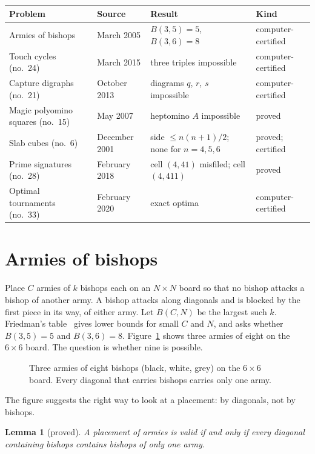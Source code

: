 \documentclass[11pt]{amsart}
\newtheorem{lemma}[theorem]{Lemma}
\theoremstyle{remark}
\begin{document}
\begin{center}
\footnotesize
\begin{tabular}{@{}llll@{}}
\toprule
Problem & Source & Result & Kind\\
\midrule
Armies of bishops & March 2005 & $B(3,5)=5$, $B(3,6)=8$ & computer-certified\\
Touch cycles (no.~24) & March 2015 & three triples impossible & computer-certified\\
Capture digraphs (no.~21) & October 2013 & diagrams $q$, $r$, $s$ impossible & computer-certified\\
Magic polyomino squares (no.~15) & May 2007 & heptomino $A$ impossible & proved\\
Slab cubes (no.~6) & December 2001 & side $\le n(n+1)/2$; none for $n=4,5,6$ & proved; certified\\
Prime signatures (no.~28) & February 2018 & cell $(4,41)$ misfiled; cell $(4,411)$ & proved\\
Optimal tournaments (no.~33) & February 2020 & exact optima & computer-certified\\
\bottomrule
\end{tabular}
\end{center}

\section{Armies of bishops}\label{sec:bishops}

Place $C$ armies of $k$ bishops each on an $N\times N$ board so that no bishop attacks a bishop of
another army. A bishop attacks along diagonals and is blocked by the first piece in its way, of
either army. Let $B(C,N)$ be the largest such $k$. Friedman's table~\cite{bishops} gives lower bounds
for small $C$ and $N$, and asks whether $B(3,5)=5$ and $B(3,6)=8$. Figure~\ref{fig:bishops} shows
three armies of eight on the $6\times6$ board. The question is whether nine is possible.

\begin{figure}[ht]
\centering

\caption{Three armies of eight bishops (black, white, grey) on the $6\times 6$ board. Every
diagonal that carries bishops carries only one army.}\label{fig:bishops}
\end{figure}

The figure suggests the right way to look at a placement: by diagonals, not by bishops.

\begin{lemma}[proved]\label{lem:diag}
A placement of armies is valid if and only if every diagonal containing bishops contains bishops of
only one army.
\end{lemma}
\end{document}
